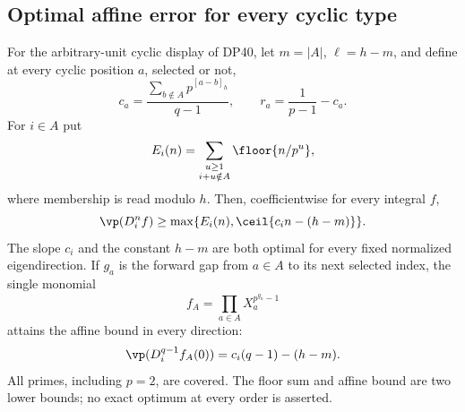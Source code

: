 \subsection{Optimal affine error for every cyclic type}

\begin{theorem}\label{DP43}
For the arbitrary-unit cyclic display of DP40, let $m=|A|$, $\ell=h-m$, and define at every cyclic position $a$, selected or not,
\[
 c_a=\frac{\sum_{b\notin A}p^{[a-b]_h}}{q-1},\qquad
 r_a=\frac1{p-1}-c_a.
\]
For $i\in A$ put
\[
 E_i(n)=\sum_{\substack{u\ge1\\i+u\notin A}}
                  \floor{n/p^u},
\]
where membership is read modulo $h$. Then, coefficientwise for every integral $f$,
\begin{equation}\label{eq:cyclicaffine}
 \vp(D_i^nf)\ge
 \max\{E_i(n),\ceil{c_in-(h-m)}\}.
\end{equation}
The slope $c_i$ and the constant $h-m$ are both optimal for every fixed normalized eigendirection. If $g_a$ is the forward gap from $a\in A$ to its next selected index, the single monomial
\[
 f_A=\prod_{a\in A}X_a^{p^{g_a}-1}
\]
attains the affine bound in every direction:
\[
 \vp(D_i^{q-1}f_A(0))=c_i(q-1)-(h-m).
\]
All primes, including $p=2$, are covered. The floor sum and affine bound are two lower bounds; no exact optimum at every order is asserted.
\end{theorem}

